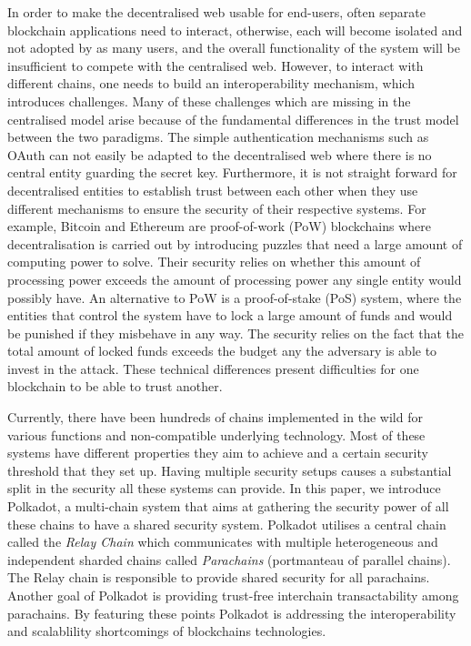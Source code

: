 In order to make the decentralised web usable for end-users, often separate blockchain applications need to interact, otherwise, each will become isolated and not adopted by as many users, and the overall functionality of the system will be insufficient to compete with the centralised web. However, to interact with different chains, one needs to build an interoperability mechanism, which introduces challenges. Many of these challenges which are missing in the centralised model arise because of the fundamental differences in the trust model between the two paradigms. The simple authentication mechanisms such as OAuth \cite{hardt2012oauth} can not easily be adapted to the decentralised web where there is no central entity guarding the secret key. Furthermore, it is not straight forward for decentralised entities to establish trust between each other when they use different mechanisms to ensure the security of their respective systems. For example, Bitcoin\cite{} and Ethereum\cite{} are proof-of-work (PoW) blockchains where decentralisation is carried out by introducing puzzles that need a large amount of computing power to solve. Their security relies on whether this amount of processing power exceeds the amount of processing power any single entity would possibly have. An alternative to PoW is a proof-of-stake (PoS) system, where the entities that control the system have to lock a large amount of funds and would be punished if they misbehave in any way. The security relies on the fact that the total amount of locked funds exceeds the budget any the adversary is able to invest in the attack. These technical differences present difficulties for one blockchain to be able to trust another.

Currently, there have been hundreds of chains implemented in the wild for various functions and non-compatible underlying technology. Most of these systems have different properties they aim to achieve and a certain security threshold that they set up. Having multiple security setups causes a substantial split in the security all these systems can provide. In this paper, we introduce Polkadot, a multi-chain system that aims at gathering the security power of all these chains to have a shared security system. Polkadot utilises a central chain called the \emph{Relay Chain} which communicates with multiple heterogeneous and independent sharded chains called \emph{Parachains} (portmanteau of parallel chains). The Relay chain is responsible to provide shared security for all parachains. Another goal of Polkadot is providing trust-free interchain transactability among parachains. By featuring these points Polkadot is  addressing the interoperability and scalablility shortcomings of blockchains technologies.

